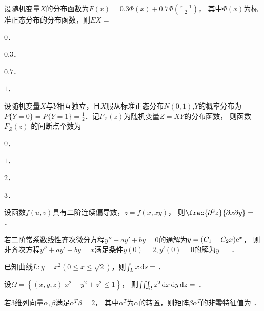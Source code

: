 \documentclass[plain,noanswer,medmath]{../../template/jnuexam}
\begin{document}
\begin{problem}
设随机变量$X$的分布函数为$F(x) = 0.3\Phi(x) + 0.7\Phi\left(\frac{x - 1}{2}\right)$，
其中$\Phi(x)$为标准正态分布的分布函数，则$EX =$\pickout{}
\begin{abcd}
\item $0$．
\item $0.3$．
\item $0.7$．
\item $1$．
\end{abcd}
\end{problem}


\begin{problem}
设随机变量$X$与$Y$相互独立，且$X$服从标准正态分布$N\left(0,1 \right)$,$Y$的概率分布为
$P\{Y = 0\} = P\{Y = 1\} = \frac{1}{2}$．记$F_Z(z)$为随机变量$Z = XY$的分布函数，
则函数$F_Z(z)$ 的间断点个数为\pickout{}
\begin{abcd}
\item $0$．
\item $1$．
\item $2$．
\item $3$．
\end{abcd}
\end{problem}




\begin{problem}
设函数$f\left(u,v \right)$具有二阶连续偏导数，$z = f(x,xy)$，
则$\frac{\pd^2 z}{\pdx\pd y}=$ \fillin{}．
\end{problem}


\begin{problem}
若二阶常系数线性齐次微分方程$y'' + ay' + by = 0$的通解为$y = (C_1 + C_2 x)\mathrm{e}^x$，
则非齐次方程$y'' + ay' + by = x$满足条件$y(0) = 2,y'(0) = 0$的解为$y =$ \fillin{}．
\end{problem}


\begin{problem}
已知曲线$L:y = x^2\left(0 \le x \le \sqrt{2} \right)$，则$\int_L x \mathop{}\!\mathrm{d} s =$ \fillin{}．
\end{problem}


\begin{problem}
设$\Omega = \left\{\left. \left(x,y,z \right) \right| x^2 + y^2 + z^2 \le 1 \right\}$，
则$\iiint_{\Omega}z^2 \mathop{}\!\mathrm{d} x\mathop{}\!\mathrm{d} y\mathop{}\!\mathrm{d} z =$ \fillin{}．
\end{problem}


\begin{problem}
若$3$维列向量$\alpha ,\beta$满足$\alpha^T\beta = 2$，
其中$\alpha^T$为$\alpha$的转置，则矩阵$\beta \alpha^T$的非零特征值为 \fillin{}．
\end{problem}
\end{document}

